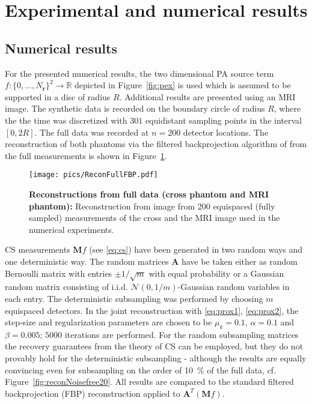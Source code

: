 \documentclass[11pt]{article}
\newcommand{\rr}{\mathbf r}
\newcommand{\source}{f}
\newcommand{\R}{\mathbb R}
\newcommand{\set}[1]{\{#1\}}
\newcommand{\fullop}{\mathbf M}
\newcommand{\Am}{\mathbf A}
\begin{document}
\section{Experimental and numerical results}
\label{sec:results}

\subsection{Numerical results}


For the presented numerical results, the two dimensional PA source term
$\source \colon \set{0, \dots, N_{\rr}}^2 \to \R$ depicted in Figure~\ref{fig:pex}
is used which is assumed to be  supported in a disc of radius $R$.
Additional results are presented using an MRI image.
The synthetic data is recorded on the  boundary circle of radius $R$, where the the time was discretized
with  $301$ equidistant sampling points in the interval $[0,2R]$. The full data was recorded
at $n=200$ detector locations. The reconstruction of both phantoms via the filtered backprojection
algorithm of \cite{FPR} from the  full measurements is shown in Figure~\ref{fig:fbpRecon}.

\begin{psfrags}
	\begin{figure}[htb!]
		\begin{center}
			\texttt{[image: pics/ReconFullFBP.pdf]}
			\caption{\textbf{Reconstructions from full data (cross phantom and MRI phantom):} \label{fig:fbpRecon} Reconstruction from image from 200
				equispaced (fully sampled) measurements of the  cross and the MRI image
				used  in the numerical experiments.}
		\end{center}
	\end{figure}
\end{psfrags}


CS measurements  $\fullop  \source$ (see \eqref{eq:cs}) have been generated in
two random ways and one  deterministic way. The random matrices $\Am$ have be taken either
as  random Bernoulli matrix with entries $\pm 1 / {\sqrt{m}}$ with equal probability or a  Gaussian random matrix consisting of i.i.d. $\mathcal{N}(0,1/{m})$-Gaussian random variables in each entry. The deterministic subsampling was performed by choosing $m$ equispaced detectors.
In the joint reconstruction with \eqref{eq:prox1}, \eqref{eq:prox2}, the step-size and regularization parameters  are chosen to be $\mu_k = 0.1$, $\alpha =  0.1$ and $\beta = 0.005$; $5000$ iterations  are performed.
For the random  subsampling matrices the recovery guarantees from the theory of CS can be employed, but they do not provably hold for the deterministic subsampling - although the results are equally convincing even for subsampling on the order of \SI{10}{\percent} of the full data, cf. Figure~\ref{fig:reconNoisefree20}.  All results are compared to the standard filtered backprojection (FBP)
reconstruction  applied  to $\Am^T ( \fullop f)$.
\end{document}
